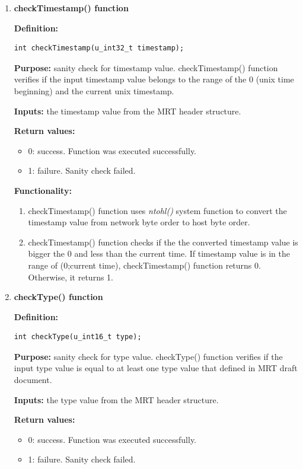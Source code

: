 \begin{enumerate}
\begin{enumerate}
\end{enumerate} %

\item{\textbf{checkTimestamp() function}}

\textbf{Definition:}  
\begin{verbatim}
int checkTimestamp(u_int32_t timestamp);
\end{verbatim}

\textbf{Purpose:}  sanity check for timestamp value.  checkTimestamp() function verifies if the input  timestamp value belongs to the range of the 0 (unix time beginning) and the current unix timestamp.

\textbf{Inputs:} the timestamp value from the MRT header structure.

\textbf{Return values:}
\begin{itemize}
\item{0: success. Function was executed successfully. }
\item{1: failure. Sanity check failed.}
\end{itemize} 

\textbf{Functionality:}

\begin{enumerate}
\item{checkTimestamp() function uses \emph{ntohl()} system function to convert the timestamp value from  network byte order to host byte order.}
\item{checkTimestamp() function checks if the the converted timestamp value is bigger the 0 and less than the current time.  If timestamp value is in the range of (0;current time),  checkTimestamp() function returns 0. Otherwise, it returns 1.}
\end{enumerate}



\item{\textbf{checkType() function}}

\textbf{Definition:}  
\begin{verbatim}
int checkType(u_int16_t type);
\end{verbatim}

\textbf{Purpose:}  sanity check for type value.  checkType() function verifies if the input  type value is equal to at least one type value that defined in MRT draft document. 

\textbf{Inputs:} the type value from the MRT header structure.

\textbf{Return values:}
\begin{itemize}
\item{0: success. Function was executed successfully. }
\item{1: failure. Sanity check failed.}
\end{itemize} 


\end{enumerate}
